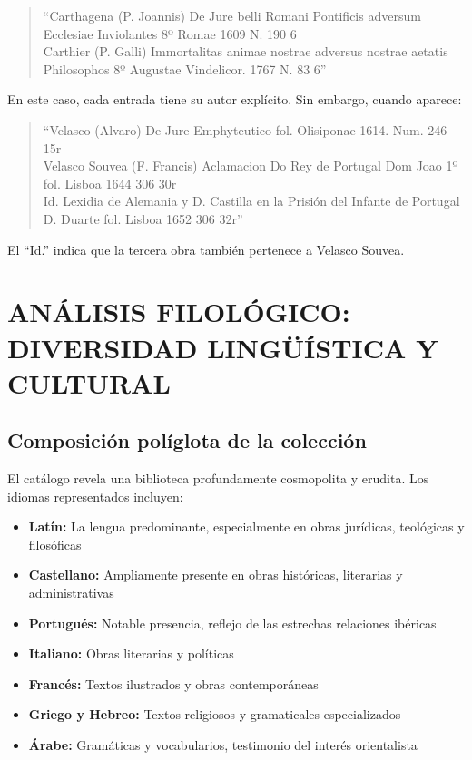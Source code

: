 \documentclass[12pt,a4paper]{article}
\begin{document}
\begin{quote}
``Carthagena (P. Joannis) De Jure belli Romani Pontificis adversum Ecclesiae Inviolantes 8º Romae 1609 N. 190 6 \\
Carthier (P. Galli) Immortalitas animae nostrae adversus nostrae aetatis Philosophos 8º Augustae Vindelicor. 1767 N. 83 6''
\end{quote}

En este caso, cada entrada tiene su autor explícito. Sin embargo, cuando aparece:

\begin{quote}
``Velasco (Alvaro) De Jure Emphyteutico fol. Olisiponae 1614. Num. 246 15r \\
Velasco Souvea (F. Francis) Aclamacion Do Rey de Portugal Dom Joao 1º fol. Lisboa 1644 306 30r \\
Id. Lexidia de Alemania y D. Castilla en la Prisión del Infante de Portugal D. Duarte fol. Lisboa 1652 306 32r''
\end{quote}

El ``Id.'' indica que la tercera obra también pertenece a Velasco Souvea.

\section{ANÁLISIS FILOLÓGICO: DIVERSIDAD LINGÜÍSTICA Y CULTURAL}

\subsection{Composición políglota de la colección}

El catálogo revela una biblioteca profundamente cosmopolita y erudita. Los idiomas representados incluyen:

\begin{itemize}
    \item \textbf{Latín:} La lengua predominante, especialmente en obras jurídicas, teológicas y filosóficas
    \item \textbf{Castellano:} Ampliamente presente en obras históricas, literarias y administrativas
    \item \textbf{Portugués:} Notable presencia, reflejo de las estrechas relaciones ibéricas
    \item \textbf{Italiano:} Obras literarias y políticas
    \item \textbf{Francés:} Textos ilustrados y obras contemporáneas
    \item \textbf{Griego y Hebreo:} Textos religiosos y gramaticales especializados
    \item \textbf{Árabe:} Gramáticas y vocabularios, testimonio del interés orientalista
\end{itemize}
\end{document}
